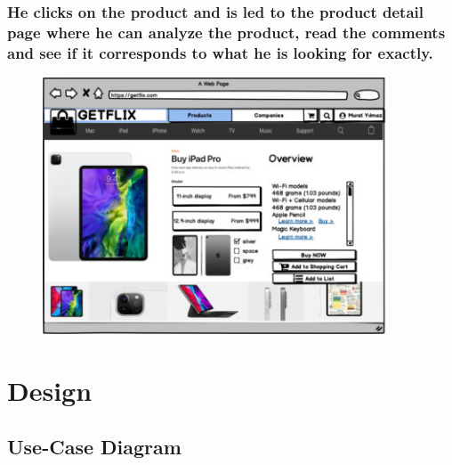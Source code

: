 \documentclass[]{article}
\begin{document}
\hypertarget{he-clicks-on-the-product-and-is-led-to-the-product-detail-page-where-he-can-analyze-the-product-read-the-comments-and-see-if-it-corresponds-to-what-he-is-looking-for-exactly.}{%
    \subsubsection{He clicks on the product and is led to the product detail
        page where he can analyze the product, read the comments and see if it
        corresponds to what he is looking for
        exactly.}\label{he-clicks-on-the-product-and-is-led-to-the-product-detail-page-where-he-can-analyze-the-product-read-the-comments-and-see-if-it-corresponds-to-what-he-is-looking-for-exactly.}}

\begin{figure}[H]
    \centering
    \includegraphics[height=3in]{./images/49.jpg}
\end{figure}

\pagebreak
\hypertarget{design}{%
    \section{Design}\label{design}}

\hypertarget{use-case-diagram-1}{%
    \subsection{Use-Case Diagram}\label{use-case-diagram-1}}
\end{document}
